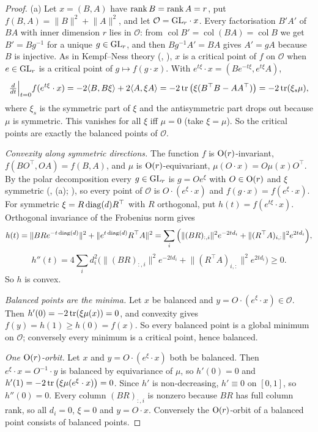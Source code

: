 \begin{proof}
(a) Let $x=(B,A)$ have $\operatorname{rank} B=\operatorname{rank} A=r$, put $f(B,A)=\lVert B\rVert^2+\lVert A\rVert^2$, and let
$\mathcal O=\mathrm{GL}_r\cdot x$. Every factorisation $B'A'$ of $BA$ with inner dimension $r$ lies in $\mathcal O$: from
$\operatorname{col}B'=\operatorname{col}(BA)=\operatorname{col}B$ we get $B'=Bg^{-1}$ for a unique $g\in\mathrm{GL}_r$, and then
$Bg^{-1}A'=BA$ gives $A'=gA$ because $B$ is injective. As in Kempf--Ness theory (, ), $x$ is a critical point
of $f$ on $\mathcal O$ when $e\in\mathrm{GL}_r$ is a critical point of $g\mapsto f(g\cdot x)$. With $e^{t\xi}\cdot x=(Be^{-t\xi},e^{t\xi}A)$,
\[\tfrac{d}{dt}\Big|_{t=0}f(e^{t\xi}\cdot x)=-2\langle B,B\xi\rangle+2\langle A,\xi A\rangle=-2\operatorname{tr}\big(\xi(B^\top B-AA^\top)\big)=-2\operatorname{tr}(\xi_s\mu),\]
where $\xi_s$ is the symmetric part of $\xi$ and the antisymmetric part drops out because $\mu$ is symmetric. This vanishes
for all $\xi$ iff $\mu=0$ (take $\xi=\mu$). So the critical points are exactly the balanced points of $\mathcal O$.

\emph{Convexity along symmetric directions.} The function $f$ is $\mathrm{O}(r)$-invariant, $f(BO^\top,OA)=f(B,A)$, and $\mu$
is $\mathrm{O}(r)$-equivariant, $\mu(O\cdot x)=O\mu(x)O^\top$. By the polar decomposition every $g\in\mathrm{GL}_r$ is $g=Oe^\xi$ with
$O\in\mathrm{O}(r)$ and $\xi$ symmetric (, (a); \citealp[\S7.3]{xhorn2013matrix}), so every point of $\mathcal O$ is
$O\cdot(e^\xi\cdot x)$ and $f(g\cdot x)=f(e^\xi\cdot x)$. For symmetric $\xi=R\operatorname{diag}(d)R^\top$ with $R$ orthogonal, put
$h(t)=f(e^{t\xi}\cdot x)$. Orthogonal invariance of the Frobenius norm gives
\[h(t)=\lVert BRe^{-t\operatorname{diag}(d)}\rVert^2+\lVert e^{t\operatorname{diag}(d)}R^\top A\rVert^2=\sum_i\Big(\lVert(BR)_{:,i}\rVert^2e^{-2td_i}+\lVert(R^\top A)_{i,:}\rVert^2e^{2td_i}\Big),\]
\[h''(t)=4\sum_id_i^2\Big(\lVert(BR)_{:,i}\rVert^2e^{-2td_i}+\lVert(R^\top A)_{i,:}\rVert^2e^{2td_i}\Big)\ge0 .\]
So $h$ is convex.

\emph{Balanced points are the minima.} Let $x$ be balanced and $y=O\cdot(e^\xi\cdot x)\in\mathcal O$. Then
$h'(0)=-2\operatorname{tr}(\xi\mu(x))=0$, and convexity gives $f(y)=h(1)\ge h(0)=f(x)$. So every balanced point is a global minimum on
$\mathcal O$; conversely every minimum is a critical point, hence balanced.

\emph{One $\mathrm{O}(r)$-orbit.} Let $x$ and $y=O\cdot(e^\xi\cdot x)$ both be balanced. Then $e^\xi\cdot x=O^{-1}\cdot y$ is
balanced by equivariance of $\mu$, so $h'(0)=0$ and $h'(1)=-2\operatorname{tr}\big(\xi\mu(e^\xi\cdot x)\big)=0$. Since $h'$ is
non-decreasing, $h'\equiv0$ on $[0,1]$, so $h''(0)=0$. Every column $(BR)_{:,i}$ is nonzero because $BR$ has full column
rank, so all $d_i=0$, $\xi=0$ and $y=O\cdot x$. Conversely the $\mathrm{O}(r)$-orbit of a balanced point consists of balanced
points.


\end{proof}
